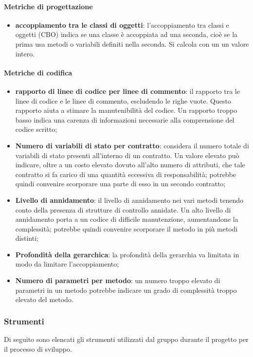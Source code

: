		\paragraph{Metriche di progettazione}
		\begin{itemize}
			\item \textbf{accoppiamento tra le classi di oggetti}:
			l'accoppiamento tra classi e oggetti (CBO) indica se una classe è accoppiata ad una seconda, cioè se la prima usa metodi o variabili definiti nella seconda. Si calcola con un un valore intero.
		\end{itemize}
		\paragraph{Metriche di codifica}
			\begin{itemize}
				\item \textbf{rapporto di linee di codice per linee di commento}: il rapporto tra le linee di codice e le linee di commento, escludendo le righe vuote. Questo rapporto aiuta a stimare la manutenibilità del codice. Un rapporto troppo basso indica una carenza di informazioni	necessarie alla comprensione del codice scritto;
				\item \textbf{Numero di variabili di stato per contratto}: considera il numero totale di variabili di stato presenti all'interno di un contratto. Un valore elevato può indicare, oltre a un costo elevato dovuto all'alto numero di attributi, che tale contratto si fa carico di una quantità eccessiva di responsabilità; potrebbe quindi convenire scorporare una parte di esso in un secondo contratto;
				\item \textbf{Livello di annidamento}: il livello di annidamento nei vari metodi tenendo	conto della presenza di strutture di controllo annidate.  Un alto livello di annidamento porta a un codice di difficile manutenzione, aumentandone la complessità; potrebbe quindi convenire scorporare il metodo in più metodi distinti;
				\item \textbf{Profondità della gerarchica}: la profondità della gerarchia va limitata in modo da limitare l'accoppiamento;
				\item \textbf{Numero di parametri per metodo}: un numero troppo elevato di parametri in un metodo potrebbe indicare un grado di complessità troppo elevato del metodo.
			\end{itemize}
			
	\subsubsection{Strumenti}
	Di seguito sono elencati gli strumenti utilizzati dal gruppo durante il 
	progetto per il processo di sviluppo.
			
